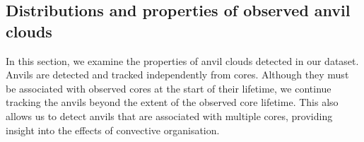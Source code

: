 







\subsection{Distributions and properties of observed anvil clouds} \label{sec:anvil_properties}

In this section, we examine the properties of anvil clouds detected in our dataset.
Anvils are detected and tracked independently from cores.
Although they must be associated with observed cores at the start of their lifetime, we continue tracking the anvils beyond the extent of the observed core lifetime.
This also allows us to detect anvils that are associated with multiple cores, providing insight into the effects of convective organisation.

